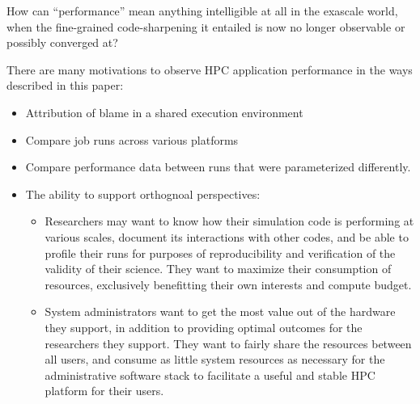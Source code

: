 How can ``performance'' mean anything intelligible at all in the
exascale world, when the fine-grained code-sharpening it entailed is now
no longer observable or possibly converged at?

There are many motivations to observe HPC application performance in
the ways described in this paper:
\begin{itemize}
\item Attribution of blame in a shared execution environment
\item Compare job runs across various platforms
\item Compare performance data between runs that were parameterized differently.
\item The ability to support orthognoal perspectives:
  \begin{itemize}
     \item Researchers may want to know how their simulation code is
       performing at various scales, document its interactions with other
       codes, and be able to profile their runs for purposes of
       reproducibility and verification of the validity of their science.
       They want to maximize their consumption of resources, exclusively
       benefitting their own interests and compute budget.
     \item System administrators want to get the most value out of the
       hardware they support, in addition to providing optimal
       outcomes for the researchers they support. They want to fairly
       share the resources between all users, and consume as little
       system resources as necessary for the administrative software
       stack to facilitate a useful and stable HPC platform for their users.
  \end{itemize}
\end{itemize}


